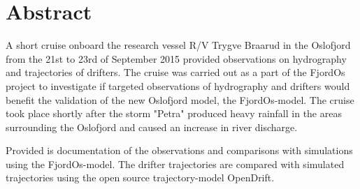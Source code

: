 \documentclass[12pt,a4paper,english]{article}
\begin{document}
\clearpage

\thispagestyle{fancy} %
\headheight=15pt
\renewcommand{\headrulewidth}{0pt}

\section*{\hspace{17mm}Abstract}
A short  cruise onboard the research vessel R/V Trygve Braarud in the Oslofjord from the 21st to 23rd of September 2015 provided observations on hydrography and trajectories of drifters. The cruise was carried out as a part of the FjordOs project to investigate if targeted observations of hydrography and drifters would benefit the validation of the new Oslofjord model, the FjordOs-model.
The cruise took place shortly after the storm "Petra" produced heavy rainfall in the areas surrounding the Oslofjord and caused an increase in river discharge. 

Provided is documentation of the observations and comparisons with simulations using the FjordOs-model. 
The drifter trajectories are compared with simulated trajectories using the open source trajectory-model OpenDrift.

\clearpage

\vfill
\end{document}
